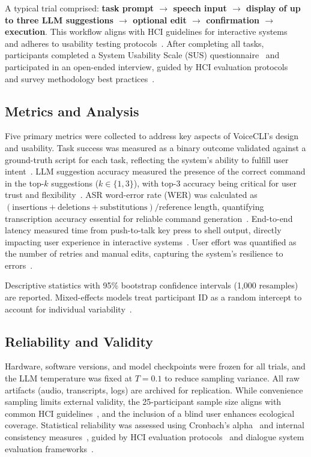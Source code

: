 \documentclass[a4paper,12pt]{article}
\begin{document}
A typical trial comprised: \textbf{task prompt $\to$ speech input $\to$ display of up to three LLM suggestions $\to$ optional edit $\to$ confirmation $\to$ execution}. This workflow aligns with HCI guidelines for interactive systems~\cite{ref12} and adheres to usability testing protocols~\cite{ref9}. After completing all tasks, participants completed a System Usability Scale (SUS) questionnaire~\cite{ref15,ref17} and participated in an open-ended interview, guided by HCI evaluation protocols~\cite{ref23} and survey methodology best practices~\cite{ref24}.

\subsection{Metrics and Analysis}
\label{sec:metrics}
\noindent Five primary metrics were collected to address key aspects of VoiceCLI's design and usability. Task success was measured as a binary outcome validated against a ground-truth script for each task, reflecting the system's ability to fulfill user intent~\cite{ref4}. LLM suggestion accuracy measured the presence of the correct command in the top-$k$ suggestions ($k \in \{1,3\}$), with top-3 accuracy being critical for user trust and flexibility~\cite{ref5}. ASR word-error rate (WER) was calculated as $(\text{insertions}+\text{deletions}+\text{substitutions})/\text{reference length}$, quantifying transcription accuracy essential for reliable command generation~\cite{ref5}. End-to-end latency measured time from push-to-talk key press to shell output, directly impacting user experience in interactive systems~\cite{ref12}. User effort was quantified as the number of retries and manual edits, capturing the system's resilience to errors~\cite{ref4}.

Descriptive statistics with 95\% bootstrap confidence intervals (1,000 resamples) are reported. Mixed-effects models treat participant ID as a random intercept to account for individual variability~\cite{ref12}.

\subsection{Reliability and Validity}
\noindent Hardware, software versions, and model checkpoints were frozen for all trials, and the LLM temperature was fixed at $T=0.1$ to reduce sampling variance. All raw artifacts (audio, transcripts, logs) are archived for replication. While convenience sampling limits external validity, the 25-participant sample size aligns with common HCI guidelines~\cite{ref12}, and the inclusion of a blind user enhances ecological coverage. Statistical reliability was assessed using Cronbach's alpha~\cite{ref23} and internal consistency measures~\cite{ref23}, guided by HCI evaluation protocols~\cite{ref22} and dialogue system evaluation frameworks~\cite{ref18}.
\end{document}
